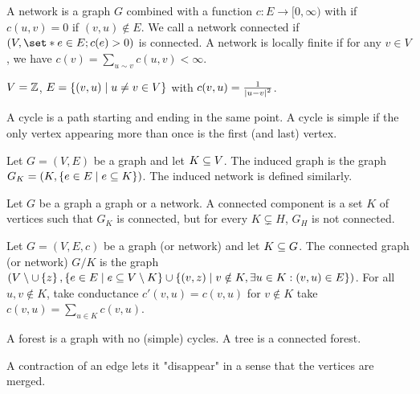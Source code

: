 \begin{defn}[Network]
  A network is a graph $G$ combined with a function $c:E\to [0,\infty)$ with if $c(u,v)=0$ if $(v,u)\notin E$. We call a network connected if $(V, \set*{e\in E; c(e)>0})$ is connected. A network is locally finite if for any \(v\in V\), we have \(c(v) = \sum_{u\sim v}c(u,v)<\infty\).  
\end{defn}


\begin{lem}[Example]
  $V=\mathbb{Z}$, $E= \left\{ {(v,u) \; \vert \; u\neq v\in V} \right\}$ with $c(v,u)=\frac{1}{\abs{u-v}^2}$.
\end{lem}


\begin{defn}[Cycle]
  A cycle is a path starting and ending in the same point. A cycle is simple if the only vertex appearing more than once is the first (and last) vertex.
\end{defn}


\begin{defn}
  Let $G=(V,E)$ be a graph and let \(K\subseteq V\). The induced graph is the graph \(G_K=(K, \left\{ {e\in E \; \vert \; e \subseteq K} \right\})\). The induced network is defined similarly. 
\end{defn}

\begin{defn}
    Let $G$ be a graph a graph or a network. A connected component is a set $K$ of vertices such that $G_K$ is connected, but for every $K\subsetneq H $, $G_H$ is not connected.
\end{defn}

\begin{defn}
  Let $G=(V,E,c)$ be a graph (or network) and let $K\subseteq G$. The connected graph (or network) $G/K$ is the graph $(V\setminus \cup \left\{ {z} \right\}, \left\{ {e \in E \; \vert \; e \subseteq V\setminus K} \right\} \cup \left\{ {(v,z) \; \vert \; v \notin K, \exists u \in K: (v,u) \in E} \right\})$. For all $u,v \notin K$, take conductance \(c'(v,u) = c(v,u)\) for $v\notin K$ take $c(v,u)=\sum_{u\in K} c(v,u)$.
\end{defn}


\begin{defn}
    A forest is a graph with no (simple) cycles. A tree is a connected forest.
\end{defn}


\begin{remark}
    A contraction of an edge lets it "disappear" in a sense that the vertices are merged.
\end{remark}


